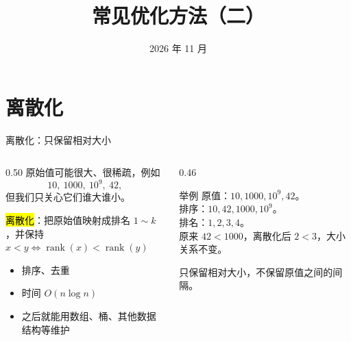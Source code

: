 \documentclass[aspectratio=169]{beamer}
\title{常见优化方法（二）}
\date{2026 年 11 月}
\begin{document}
\begin{frame}
    \titlepage
\end{frame}

\section{离散化}

\begin{frame}{离散化：只保留相对大小}
    \begin{columns}[T]
        \begin{column}{0.50\textwidth}
            \small
            原始值可能很大、很稀疏，例如
            \[
                10,\ 1000,\ 10^9,\ 42,
            \]
            但我们只关心它们谁大谁小。

            \vspace{0.4em}
            \hl{离散化}：把原始值映射成排名 $1\sim k$，并保持\\
            $x<y \iff \operatorname{rank}(x)<\operatorname{rank}(y)$
            \begin{itemize}
                \item 排序、去重
                \item 时间 $O(n\log n)$
                \item 之后就能用数组、桶、其他数据结构等维护
            \end{itemize}
        \end{column}
        \begin{column}{0.46\textwidth}
            \begin{exampleblock}{举例}
                \footnotesize
                原值：$10,1000,10^9,42$。\\
                排序：$10,42,1000,10^9$。\\
                排名：$1,2,3,4$。\\
                原来 $42<1000$，离散化后 $2<3$，大小关系不变。
            \end{exampleblock}
            \vspace{0.4em}
            \footnotesize
            只保留相对大小，不保留原值之间的间隔。
        \end{column}
    \end{columns}
\end{frame}
\end{document}
